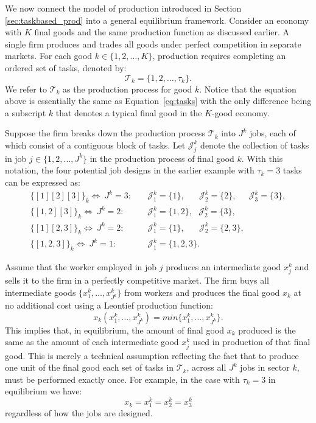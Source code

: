 \documentclass{article}
\theoremstyle{plain}
\theoremstyle{plain}
\begin{document}
We now connect the model of production introduced in Section \ref{sec:taskbased_prod} into a general equilibrium framework.
Consider an economy with $K$ final goods and the same production function as discussed earlier.
A single firm produces and trades all goods under perfect competition in separate markets.
For each good $k \in \{1, 2,\ldots,K\}$, production requires completing an ordered set of tasks, denoted by:
\[
\mathcal{T}_k = \{1,2,\ldots,\tau_k\}.
\]
We refer to $\mathcal{T}_k$ as the production process for good $k$.
Notice that the equation above is essentially the same as Equation~\ref{eq:tasks} with the only difference being a subscript $k$ that denotes a typical final good in the $K$-good economy.

Suppose the firm breaks down the production process $\mathcal{T}_k$ into $J^k$ jobs, each of which consist of a contiguous block of tasks.
Let $\mathcal{J}_j^k$ denote the collection of tasks in job $j \in \{1, 2, \ldots, J^k\}$ in the production process of final good $k$.
With this notation, the four potential job designs in the earlier example with $\tau_k=3$ tasks can be expressed as:
\begin{align*}
\{[1][2][3]\}_k \Longleftrightarrow \ J^k = 3:  & \quad \mathcal{J}^k_1 = \{1\}, \quad \ \ \ \mathcal{J}^k_2 = \{2\}, \quad \ \ \mathcal{J}^k_3 = \{3\}, \\
\{[1,2][3]\}_k \Longleftrightarrow \ J^k = 2: & \quad \mathcal{J}^k_1 = \{1, 2\}, \ \ \ \mathcal{J}^k_2 = \{3\}, \\
\{[1][2,3]\}_k \Longleftrightarrow \ J^k = 2: & \quad \mathcal{J}^k_1 = \{1\}, \quad \ \ \ \mathcal{J}^k_2 = \{2, 3\}, \\
\{[1,2,3]\}_k \Longleftrightarrow \ J^k = 1: & \quad \mathcal{J}^k_1 = \{1,2,3\}.
\end{align*}

Assume that the worker employed in job $j$ produces an intermediate good $x_j^k$ and sells it to the firm in a perfectly competitive market.
The firm buys all intermediate goods $\{x_1^k, \ldots, x_{J^k}^k\}$ from workers and produces the final good $x_k$ at no additional cost using a Leontief production function:
\[
x_k(x_1^k, \ldots, x_{J^k}^k) = min\{x_1^k, \ldots, x_{J^k}^k\}.
\]
This implies that, in equilibrium, the amount of final good $x_k$ produced is the same as the amount of each intermediate good $x_j^k$ used in production of that final good.
This is merely a technical assumption reflecting the fact that to produce one unit of the final good each set of tasks in $\mathcal{T}_k$, across all $J^k$ jobs in sector $k$, must be performed exactly once.
For example, in the case with $\tau_k=3$ in equilibrium we have:
\[
x_k = x_1^k = x_2^k = x_3^k
\]
regardless of how the jobs are designed.
\end{document}
